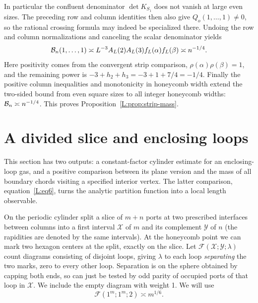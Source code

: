 \documentclass[11pt]{article}
\numberwithin{equation}{section}
\theoremstyle{definition}\newtheorem{definition}[theorem]{Definition}
\theoremstyle{remark}\newtheorem{remark}[theorem]{Remark}
\begin{document}
In particular the confluent denominator $\det K_{S_1}$ does not vanish
at large even sizes. The preceding row and column identities then also
give $Q_o(1,\ldots,1)\ne0$, so the rational crossing formula may indeed
be specialized there. Undoing the row and column normalizations and
canceling the scalar denominator yields
\[
 {\cal B}_n(1,\ldots,1)
 \asymp L^{-3}A_L(2)A_L(3)f_L(\alpha)f_L(\beta)
 \asymp n^{-1/4}.
\]
Here positivity comes from the convergent strip comparison,
$\rho(\alpha)\rho(\beta)=1$, and the remaining power is
$-3+h_2+h_3=-3+1+7/4=-1/4$. Finally the positive column inequalities
and monotonicity in honeycomb width extend the two-sided bound from
even square sizes to all integer honeycomb widths:
${\cal B}_n\asymp n^{-1/4}$. This proves Proposition~\ref{L:prop:strip-mass}.

\section{A divided slice and enclosing loops}\label{L:part7}

This section has two outputs: a constant-factor cylinder estimate for an
enclosing-loop gas, and a positive comparison between its plane version
and the mass of all boundary chords visiting a specified interior vertex.
The latter comparison, equation~\eqref{L:eq6}, turns the analytic
partition function into a local length observable.

On the periodic cylinder split a slice of \(m+n\) ports at two prescribed interfaces between columns into a first interval \(\mathcal X\) of \(m\) and its complement \(\mathcal Y\) of \(n\) (the rapidities are denoted by the same intervals). At the honeycomb point we can mark two hexagon centers at the split, exactly on the slice. Let \(\mathcal F(\mathcal X;\mathcal Y;\lambda)\) count diagrams consisting of disjoint loops, giving \(\lambda\) to each loop \emph{separating} the two marks, zero to every other loop. Separation is on the sphere obtained by capping both ends, so can just be tested by odd parity of occupied ports of that loop in \(\mathcal X\). We include the empty diagram with weight 1. We will use
\begin{equation}
 \mathcal F(1^m;1^m;2)\asymp m^{1/6}.\label{L:eq1}
\end{equation}
\end{document}
